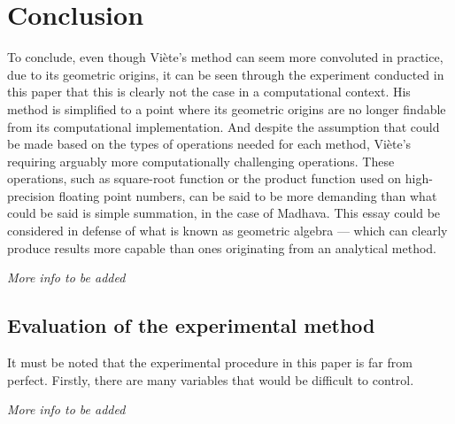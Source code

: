 \section{Conclusion}

To conclude, even though Viète's method can seem more convoluted in practice, due to its geometric origins, 
it can be seen through the experiment conducted in this paper that this is clearly not the case 
in a computational context. His method is simplified to a point where its geometric origins are no 
longer findable from its computational implementation. And despite the assumption that could be 
made based on the types of operations needed for each method, Viète's requiring arguably more 
computationally challenging operations. These operations, such as square-root function or the product function 
used on high-precision floating point numbers, can be said to be more demanding than what could be said 
is simple summation, in the case of Madhava. This essay could be considered in defense of 
what is known as geometric algebra --- which can clearly produce results more capable than ones 
originating from an analytical method. 

\textit{More info to be added}

\subsection{Evaluation of the experimental method}

It must be noted that the experimental procedure in this paper is far from perfect. Firstly, 
there are many variables that would be difficult to control. 


\textit{More info to be added}